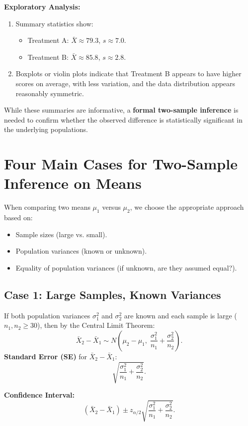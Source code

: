 \documentclass[10pt]{extarticle}
\begin{document}
\textbf{Exploratory Analysis:}
\begin{enumerate}
    \item Summary statistics show:
    \begin{itemize}
        \item Treatment A: $\bar{X} \approx 79.3$, $s \approx 7.0$.
        \item Treatment B: $\bar{X} \approx 85.8$, $s \approx 2.8$.
    \end{itemize}
    \item Boxplots or violin plots indicate that Treatment B appears to have higher scores on average, with less variation, and the data distribution appears reasonably symmetric.
\end{enumerate}
While these summaries are informative, a \textbf{formal two-sample inference} is needed to confirm whether the observed difference is statistically significant in the underlying populations.

\bigskip

\section{Four Main Cases for Two-Sample Inference on Means}

When comparing two means $\mu_1$ versus $\mu_2$, we choose the appropriate approach based on:
\begin{itemize}
    \item Sample sizes (large vs. small).
    \item Population variances (known or unknown).
    \item Equality of population variances (if unknown, are they assumed equal?).
\end{itemize}

\subsection{Case 1: Large Samples, Known Variances}
If both population variances $\sigma_1^2$ and $\sigma_2^2$ are known and each sample is large ($n_1, n_2 \ge 30$), then by the Central Limit Theorem:
\[
\bar{X}_2 - \bar{X}_1 \sim N\!\left(\mu_2 - \mu_1, \; \frac{\sigma_1^2}{n_1} + \frac{\sigma_2^2}{n_2}\right).
\]
\textbf{Standard Error (SE)} for $\bar{X}_2 - \bar{X}_1$:
\[
\sqrt{\frac{\sigma_1^2}{n_1} + \frac{\sigma_2^2}{n_2}}.
\]

\textbf{Confidence Interval:}
\[
(\bar{X}_2 - \bar{X}_1) \pm z_{\alpha/2} \sqrt{\frac{\sigma_1^2}{n_1} + \frac{\sigma_2^2}{n_2}}.
\]
\end{document}
